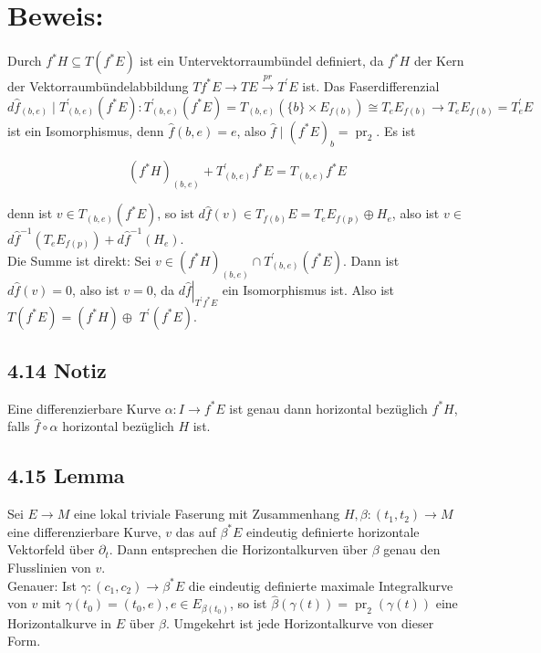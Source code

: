 \documentclass[10pt, letterpaper]{article}
\begin{document}
\section*{Beweis:}
Durch $f^{*} H \subseteq T\left(f^{*} E\right)$ ist ein Untervektorraumbündel definiert, da $f^{*} H$ der Kern der Vektorraumbündelabbildung $T f^{*} E \rightarrow T E \xrightarrow{p r} T^{\prime} E$ ist. Das Faserdifferenzial\\
$d \hat{f}_{(b, e)} \mid T_{(b, e)}^{\prime}\left(f^{*} E\right): T_{(b, e)}^{\prime}\left(f^{*} E\right)=T_{(b, e)}\left(\{b\} \times E_{f(b)}\right) \cong T_{e} E_{f(b)} \rightarrow T_{e} E_{f(b)}=T_{e}^{\prime} E$\\
ist ein Isomorphismus, denn $\hat{f}(b, e)=e$, also $\hat{f} \mid\left(f^{*} E\right)_{b}=\operatorname{pr}_{2}$. Es ist

$$
\left(f^{*} H\right)_{(b, e)}+T_{(b, e)}^{\prime} f^{*} E=T_{(b, e)} f^{*} E
$$

denn ist $v \in T_{(b, e)}\left(f^{*} E\right)$, so ist $d \hat{f}(v) \in T_{f(b)} E=T_{e} E_{f(p)} \oplus H_{e}$, also ist $v \in$ $d \hat{f}^{-1}\left(T_{e} E_{f(p)}\right)+d \hat{f}^{-1}\left(H_{e}\right)$.\\
Die Summe ist direkt: Sei $v \in\left(f^{*} H\right)_{(b, e)} \cap T_{(b, e)}^{\prime}\left(f^{*} E\right)$. Dann ist $d \hat{f}(v)=0$, also ist $v=0$, da $\left.d \hat{f}\right|_{T^{\prime} f^{*} E}$ ein Isomorphismus ist. Also ist $T\left(f^{*} E\right)=\left(f^{*} H\right) \oplus$ $T^{\prime}\left(f^{*} E\right)$.

\subsection*{4.14 Notiz}
Eine differenzierbare Kurve $\alpha: I \rightarrow f^{*} E$ ist genau dann horizontal bezüglich $f^{*} H$, falls $\hat{f} \circ \alpha$ horizontal bezüglich $H$ ist.

\subsection*{4.15 Lemma}
Sei $E \rightarrow M$ eine lokal triviale Faserung mit Zusammenhang $H, \beta:\left(t_{1}, t_{2}\right) \rightarrow M$ eine differenzierbare Kurve, $v$ das auf $\beta^{*} E$ eindeutig definierte horizontale Vektorfeld über $\partial_{t}$. Dann entsprechen die Horizontalkurven über $\beta$ genau den Flusslinien von $v$.\\
Genauer: Ist $\gamma:\left(c_{1}, c_{2}\right) \rightarrow \beta^{*} E$ die eindeutig definierte maximale Integralkurve von $v$ mit $\gamma\left(t_{0}\right)=\left(t_{0}, e\right), e \in E_{\beta\left(t_{0}\right)}$, so ist $\hat{\beta}(\gamma(t))=\operatorname{pr}_{2}(\gamma(t))$ eine Horizontalkurve in $E$ über $\beta$. Umgekehrt ist jede Horizontalkurve von dieser Form.
\end{document}
